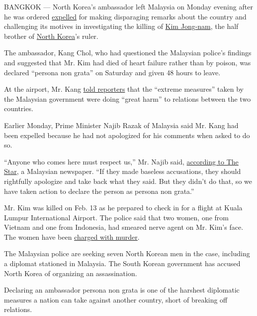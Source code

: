 BANGKOK --- North Korea's ambassador left Malaysia on Monday evening
after he was ordered
\href{https://www.nytimes.com/2017/03/04/world/asia/malaysia-north-korea-kim-jong-nam.html}{expelled}
for making disparaging remarks about the country and challenging its
motives in investigating the killing of
\href{https://www.nytimes.com/2017/02/15/world/asia/kim-jong-nam-assassination-north-korea.html}{Kim
Jong-nam}, the half brother of
\href{https://www.nytimes.com/topic/destination/north-korea?inline=nyt-geo}{North
Korea}'s ruler.

The ambassador, Kang Chol, who had questioned the Malaysian police's
findings and suggested that Mr. Kim had died of heart failure rather
than by poison, was declared ``persona non grata'' on Saturday and given
48 hours to leave.

At the airport, Mr. Kang
\href{http://www.channelnewsasia.com/news/asiapacific/expelled-north-korean-envoy-says-malaysia-s-extreme-measures/3572102.html?utm_source=dlvr.it\&utm_medium=twitter}{told
reporters} that the ``extreme measures'' taken by the Malaysian
government were doing ``great harm'' to relations between the two
countries.

Earlier Monday, Prime Minister Najib Razak of Malaysia said Mr. Kang had
been expelled because he had not apologized for his comments when asked
to do so.

``Anyone who comes here must respect us,'' Mr. Najib said,
\href{http://www.thestar.com.my/news/nation/2017/03/06/malaysian-leaders-double-down-on-n-korea/}{according
to The Star}, a Malaysian newspaper. ``If they made baseless
accusations, they should rightfully apologize and take back what they
said. But they didn't do that, so we have taken action to declare the
person as persona non grata.''

Mr. Kim was killed on Feb. 13 as he prepared to check in for a flight at
Kuala Lumpur International Airport. The police said that two women, one
from Vietnam and one from Indonesia, had smeared nerve agent on Mr.
Kim's face. The women have been
\href{https://www.nytimes.com/2017/02/28/world/asia/north-korea-kim-jong-nam-death.html}{charged
with murder}.

The Malaysian police are seeking seven North Korean men in the case,
including a diplomat stationed in Malaysia. The South Korean government
has accused North Korea of organizing an assassination.

Declaring an ambassador persona non grata is one of the harshest
diplomatic measures a nation can take against another country, short of
breaking off relations.

